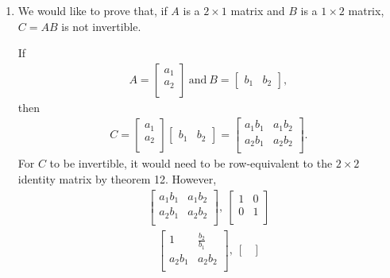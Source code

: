 \documentclass[12pt]{article}
\begin{document}
\begin{enumerate}
  \item
    We would like to prove that, if $A$ is a $2 \times 1$ matrix
    and $B$ is a $1 \times 2$ matrix, $C = AB$ is not invertible.

    If
    \begin{align*}
      A =
      \begin{bmatrix}
        a_1\\
        a_2\\
      \end{bmatrix}\ \text{and}\
      B =
      \begin{bmatrix}
        b_1 & b_2
      \end{bmatrix},
    \end{align*}
    then
    \begin{align*}
      C =
      \begin{bmatrix}
        a_1\\
        a_2\\
      \end{bmatrix}
      \begin{bmatrix}
        b_1 & b_2
      \end{bmatrix}
      =
      \begin{bmatrix}
        a_1b_1 & a_1b_2\\
        a_2b_1 & a_2b_2\\
      \end{bmatrix}.
    \end{align*}
    For $C$ to be invertible, it would need to be row-equivalent
    to the $2 \times 2$ identity matrix by theorem 12. However,
    \begin{align*}
      \begin{bmatrix}
        a_1b_1 & a_1b_2\\
        a_2b_1 & a_2b_2\\
      \end{bmatrix},\
      \begin{bmatrix}
        1 & 0\\
        0 & 1\\
      \end{bmatrix}
    \end{align*}
    \begin{align*}
      \begin{bmatrix}
        1 & \frac{b_2}{b_1}\\
        a_2b_1 & a_2b_2\\
      \end{bmatrix},\
      \begin{bmatrix}

\end{bmatrix}
\end{align*}
\end{enumerate}
\end{document}

